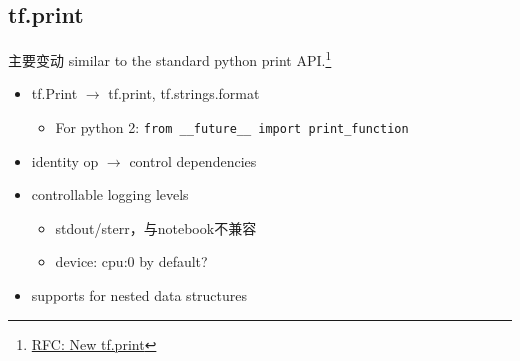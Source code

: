 
\subsection{tf.print}
\begin{frame}{主要变动}
    similar to the standard python print API.\footnote{\href{https://github.com/tensorflow/community/pull/14}{RFC: New tf.print}}


    \begin{itemize}
        \item tf.Print $\to$ tf.print, tf.strings.format
            \begin{itemize}
                \item For python 2: \lstinline{from __future__ import print_function}
            \end{itemize}
        \item identity op $\to$ control dependencies
        \item controllable logging levels
            \begin{itemize}
                \item stdout/sterr，与notebook不兼容
                \item device: cpu:0 by default?
            \end{itemize}
        \item supports for nested data structures
    \end{itemize}
\end{frame}

\begin{frame}[fragile]
%
\end{frame}
